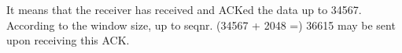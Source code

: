 It means that the receiver has received and ACKed the data up to 34567. According to the window size, up to seqnr. (34567 + 2048 =) 36615 may be sent upon receiving this ACK.